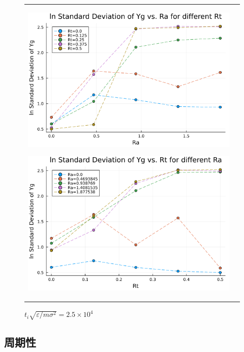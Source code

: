 \begin{figure}[H]
  \begin{tabular}{cc}
    \begin{minipage}[t]{0.5\hsize}
      \centering
      \includegraphics[width=\textwidth]{image/lnStdYg_Ra0.0to1.877538_Rt0.0to0.5_ti25000.png}
      \subcaption{}
      \label{}
    \end{minipage}
    \begin{minipage}[t]{0.5\hsize}
      \centering
      \includegraphics[width=\textwidth]{image/lnStdYg_Rt0.0to0.5_Ra0.0to1.877538_ti25000.png}
      \subcaption{}
      \label{}
    \end{minipage}
  \end{tabular}
  \caption{$t_i \sqrt{\varepsilon / m \sigma^2} = 2.5 \times 10^{4}$}
  \label{}
\end{figure}

\subsection{周期性}

